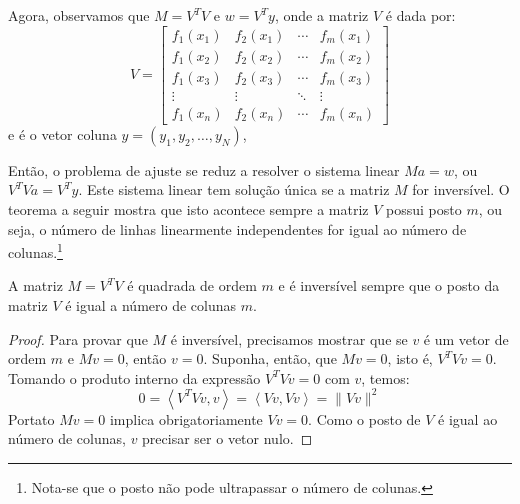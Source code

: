 Agora, observamos que $M=V^TV$ e $w=V^T y$, onde a matriz $V$ é dada por:
\begin{equation*}
  V=\begin{bmatrix}
    f_1(x_1)&f_2(x_1) & \cdots & f_m(x_1)\\
    f_1(x_2)&f_2(x_2) & \cdots & f_m(x_2)\\
    f_1(x_3)&f_2(x_3) & \cdots & f_m(x_3)\\
    \vdots & \vdots & \ddots & \vdots\\
    f_1(x_n)&f_2(x_n) & \cdots & f_m(x_n)
  \end{bmatrix}
\end{equation*}
e é o vetor coluna $y = (y_1, y_2, \dotsc, y_N)$,

Então, o problema de ajuste se reduz a resolver o sistema linear $Ma=w$, ou $V^TVa = V^T y$. Este sistema linear tem solução única se a matriz $M$ for inversível. O teorema a seguir mostra que isto acontece sempre a matriz $V$ possui posto $m$, ou seja, o número de linhas linearmente independentes for igual ao número de colunas.\footnote{Nota-se que o posto não pode ultrapassar o número de colunas.}


\begin{teo}
A matriz $M=V^TV$ é quadrada de ordem $m$ e é inversível sempre que o posto da matriz $V$ é igual a número de colunas $m$.
\end{teo}
\begin{proof}
Para provar que $M$ é inversível, precisamos mostrar que se $v$ é um vetor de ordem $m$ e $Mv=0$, então $v=0$. Suponha, então, que $Mv=0$, isto é, 
$V^TVv=0$. Tomando o produto interno da expressão $V^TVv=0$ com $v$, temos:
$$0=\left<V^TVv,v\right>=\left<Vv,Vv\right>=\|Vv\|^2$$
Portato $Mv=0$ implica obrigatoriamente $Vv=0$. Como o posto de $V$ é igual ao número de colunas, $v$ precisar ser o vetor nulo.
\end{proof}

